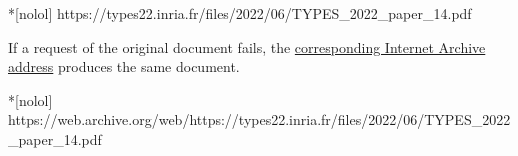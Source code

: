 \begin{center}
\begin{minipage}{\textwidth}
\begin{cmdlisting}*[nolol]
https://types22.inria.fr/files/2022/06/TYPES_2022_paper_14.pdf
\end{cmdlisting}
\end{minipage}
\end{center}

If a request of the original document fails, the \href{https://web.archive.org/web/https://types22.inria.fr/files/2022/06/TYPES_2022_paper_14.pdf}
{corresponding Internet Archive address} produces the same document.

\begin{center}
\begin{minipage}{\textwidth}
\begin{cmdlisting}*[nolol]
https://web.archive.org/web/https://types22.inria.fr/files/2022/06/TYPES_2022_paper_14.pdf
\end{cmdlisting}
\end{minipage}
\end{center}
